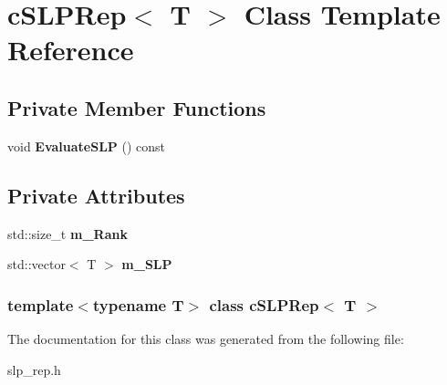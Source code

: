 \hypertarget{classcSLPRep}{
\section{c\-S\-L\-P\-Rep$<$ \-T $>$ \-Class \-Template \-Reference}
\label{classcSLPRep}
}
\subsection*{\-Private \-Member \-Functions}
\begin{DoxyCompactItemize}
\item 
\hypertarget{classcSLPRep_a426437f339e324639960d31d80a88c16}{
void {\bfseries \-Evaluate\-S\-L\-P} () const }
\label{classcSLPRep_a426437f339e324639960d31d80a88c16}

\end{DoxyCompactItemize}
\subsection*{\-Private \-Attributes}
\begin{DoxyCompactItemize}
\item 
\hypertarget{classcSLPRep_a5da028fd67619a049145140669a44eb1}{
std\-::size\-\_\-t {\bfseries m\-\_\-\-Rank}}
\label{classcSLPRep_a5da028fd67619a049145140669a44eb1}

\item 
\hypertarget{classcSLPRep_a8545e9ddf3197b62c4cd38fbae189a26}{
std\-::vector$<$ \-T $>$ {\bfseries m\-\_\-\-S\-L\-P}}
\label{classcSLPRep_a8545e9ddf3197b62c4cd38fbae189a26}

\end{DoxyCompactItemize}
\subsubsection*{template$<$typename T$>$ class c\-S\-L\-P\-Rep$<$ T $>$}



\-The documentation for this class was generated from the following file\-:\begin{DoxyCompactItemize}
\item 
slp\-\_\-rep.\-h\end{DoxyCompactItemize}
